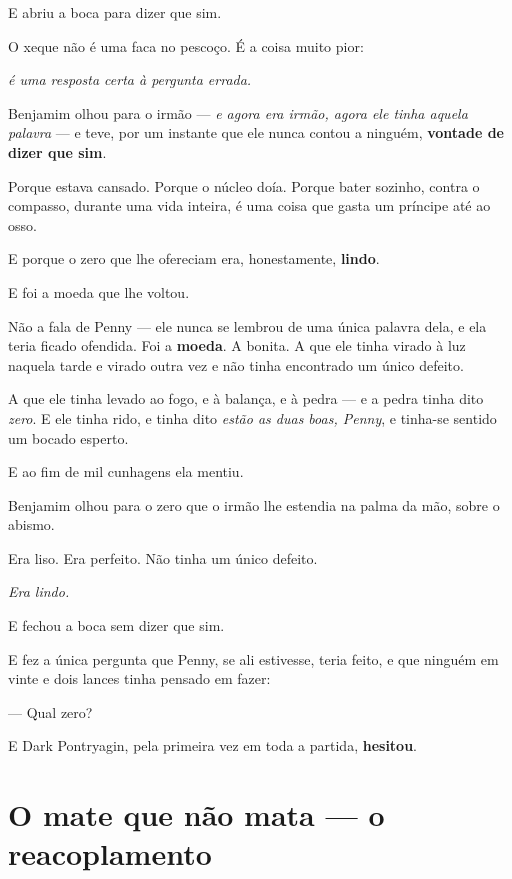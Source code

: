\documentclass[livro.tex]{subfiles}
\begin{document}
E abriu a boca para dizer que sim.

O xeque não é uma faca no pescoço. É a coisa muito pior:

\begin{center}\itshape
é uma resposta certa à pergunta errada.
\end{center}

Benjamim olhou para o irmão --- \emph{e agora era irmão, agora ele tinha aquela palavra} --- e teve, por um instante
que ele nunca contou a ninguém, \textbf{vontade de dizer que sim}.

Porque estava cansado. Porque o núcleo doía. Porque bater sozinho, contra o compasso, durante uma vida inteira, é
uma coisa que gasta um príncipe até ao osso.

E porque o zero que lhe ofereciam era, honestamente, \textbf{lindo}.

\medskip

E foi a moeda que lhe voltou.

Não a fala de Penny --- ele nunca se lembrou de uma única palavra dela, e ela teria ficado ofendida. Foi a
\textbf{moeda}. A bonita. A que ele tinha virado à luz naquela tarde e virado outra vez e não tinha encontrado um
único defeito.

A que ele tinha levado ao fogo, e à balança, e à pedra --- e a pedra tinha dito \emph{zero}. E ele tinha rido, e
tinha dito \emph{estão as duas boas, Penny}, e tinha-se sentido um bocado esperto.

E ao fim de mil cunhagens ela mentiu.

\medskip

Benjamim olhou para o zero que o irmão lhe estendia na palma da mão, sobre o abismo.

Era liso. Era perfeito. Não tinha um único defeito.

\emph{Era lindo.}

\medskip

E fechou a boca sem dizer que sim.

E fez a única pergunta que Penny, se ali estivesse, teria feito, e que ninguém em vinte e dois lances tinha pensado
em fazer:

--- Qual zero?

\medskip

E Dark Pontryagin, pela primeira vez em toda a partida, \textbf{hesitou}.


\chapter{O mate que não mata --- o reacoplamento}
\end{document}
